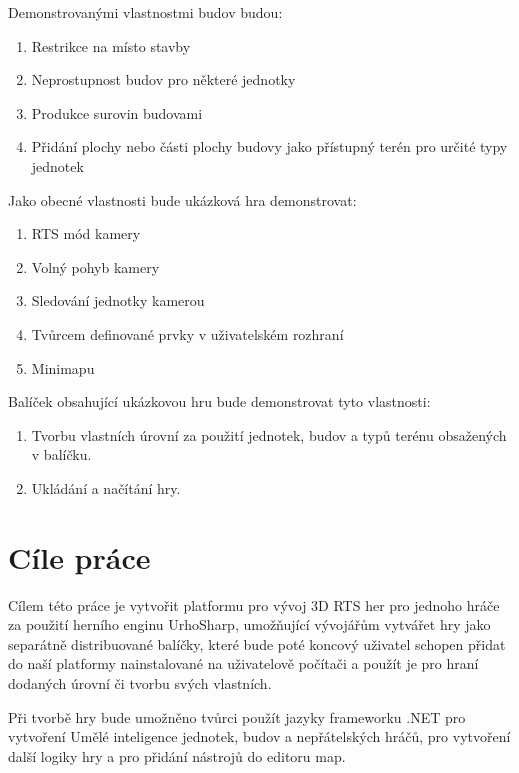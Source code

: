 Demonstrovanými vlastnostmi budov budou:
\begin{enumerate}
	\item Restrikce na místo stavby
	\item Neprostupnost budov pro některé jednotky
	\item Produkce surovin budovami
	\item Přidání plochy nebo části plochy budovy jako přístupný terén pro určité typy jednotek
\end{enumerate}

Jako obecné vlastnosti bude ukázková hra demonstrovat:
\begin{enumerate}
	\item RTS mód kamery
	\item Volný pohyb kamery
	\item Sledování jednotky kamerou
	\item Tvůrcem definované prvky v uživatelském rozhraní
	\item Minimapu
\end{enumerate}

Balíček obsahující ukázkovou hru bude demonstrovat tyto vlastnosti:
\begin{enumerate}
	\item Tvorbu vlastních úrovní za použití jednotek, budov a typů terénu obsažených v balíčku.
	\item Ukládání a načítání hry.
\end{enumerate}

\section{Cíle práce}
\label{sec:cileprace}
Cílem této práce je vytvořit platformu pro vývoj 3D RTS her pro jednoho hráče za použití herního enginu UrhoSharp, umožňující vývojářům vytvářet hry jako separátně 
distribuované balíčky, které bude poté koncový uživatel schopen přidat do naší platformy nainstalované na uživatelově počítači a použít je pro hraní dodaných úrovní či tvorbu svých vlastních.

Při tvorbě hry bude umožněno tvůrci použít jazyky frameworku .NET  pro vytvoření Umělé inteligence jednotek, budov a nepřátelských hráčů, pro vytvoření další logiky hry a pro přidání nástrojů do editoru map. 

